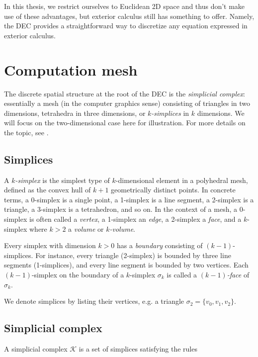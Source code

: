 \documentclass[utf8,english]{gradu3}
\begin{document}
In this thesis, we restrict ourselves to Euclidean 2D space
and thus don't make use of these advantages,
but exterior calculus still has something to offer.
Namely, the DEC provides a straightforward way
to discretize any equation expressed in exterior calculus.


\section{Computation mesh}

The discrete spatial structure at the root of the DEC is the \textit{simplicial complex}:
essentially a mesh (in the computer graphics sense)
consisting of triangles in two dimensions,
tetrahedra in three dimensions, or \textit{$k$-simplices} in $k$ dimensions.
We will focus on the two-dimensional case here for illustration.
For more details on the topic, see \textcite{desbrun_discrete_2006}.


\subsection{Simplices}

A \textit{$k$-simplex} is the simplest type of $k$-dimensional element
in a polyhedral mesh, defined as
the convex hull of $k + 1$ geometrically distinct points.
In concrete terms, a 0-simplex is a single point,
a 1-simplex is a line segment, a 2-simplex is a triangle,
a 3-simplex is a tetrahedron, and so on.
In the context of a mesh, a 0-simplex is often called a \textit{vertex},
a 1-simplex an \textit{edge}, a 2-simplex a \textit{face},
and a $k$-simplex where $k > 2$ a \textit{volume} or \textit{$k$-volume}.

Every simplex with dimension $k > 0$
has a \textit{boundary} consisting of $(k-1)$-simplices.
For instance, every triangle (2-simplex) is bounded by three line segments (1-simplices),
and every line segment is bounded by two vertices.
Each $(k-1)$-simplex on the boundary of a $k$-simplex $\sigma_k$
is called a \textit{$(k-1)$-face} of $\sigma_k$.

We denote simplices by listing their vertices, e.g. a triangle
$\sigma_2 = \{v_0, v_1, v_2\}$.


\subsection{Simplicial complex}

A simplicial complex $\mathcal{K}$ is a set of simplices satisfying the rules
\end{document}
